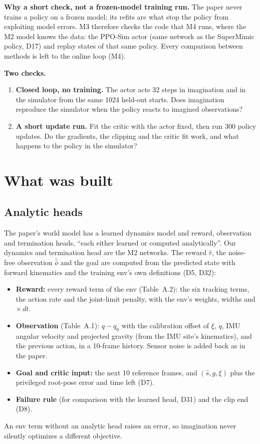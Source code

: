\documentclass[10pt]{article}
\begin{document}
\textbf{Why a short check, not a frozen-model training run.} The paper never trains a policy on a
frozen model; its refits are what stop the policy from exploiting model errors. M3 therefore checks
the code that M4 runs, where the M2 model knows the data: the PPO-Sim actor (same network as the
SuperMimic policy, D17) and replay states of that same policy. Every comparison between methods is
left to the online loop (M4).

\textbf{Two checks.}
\begin{enumerate}
  \item \textbf{Closed loop, no training.} The actor acts 32 steps in imagination and in the
  simulator from the same 1024 held-out starts. Does imagination reproduce the simulator when the
  policy reacts to imagined observations?
  \item \textbf{A short update run.} Fit the critic with the actor fixed, then run 300 policy
  updates. Do the gradients, the clipping and the critic fit work, and what happens to the policy in
  the simulator?
\end{enumerate}

\section{What was built}

\subsection{Analytic heads}

The paper's world model has a learned dynamics model and reward, observation and termination heads,
``each either learned or computed analytically''. Our dynamics and termination head are the M2
networks. The reward $\hat r$, the noise-free observation $\hat{\bar o}$ and the goal are computed from
the predicted state with forward kinematics and the training env's own definitions (D5, D32):
\begin{itemize}
  \item \textbf{Reward:} every reward term of the env (Table~A.2): the six tracking terms, the action
  rate and the joint-limit penalty, with the env's weights, widths and $\times\,dt$.
  \item \textbf{Observation} (Table~A.1): $q - q_0$ with the calibration offset of $\xi$, $\dot q$,
  IMU angular velocity and projected gravity (from the IMU site's kinematics), and the previous
  action, in a 10-frame history. Sensor noise is added back as in the paper.
  \item \textbf{Goal and critic input:} the next 10 reference frames, and $(\hat s, g, \xi)$ plus the
  privileged root-pose error and time left (D7).
  \item \textbf{Failure rule} (for comparison with the learned head, D31) and the clip end (D8).
\end{itemize}
An env term without an analytic head raises an error, so imagination never silently optimizes a
different objective.
\end{document}
